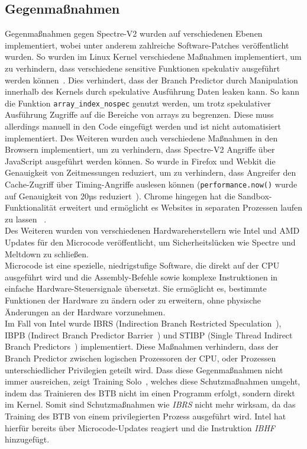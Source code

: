 \subsection{Gegenmaßnahmen}
\label{subsec:spectre_gegenmassnahmen}
Gegenmaßnahmen gegen Spectre-V2 wurden auf verschiedenen Ebenen implementiert, wobei unter anderem zahlreiche Software-Patches veröffentlicht wurden.
So wurden im Linux Kernel verschiedene Maßnahmen implementiert, um zu verhindern, dass verschiedene sensitive Funktionen spekulativ ausgeführt werden können~\cite{linux_nospec}.
Dies verhindert, dass der Branch Predictor durch Manipulation innerhalb des Kernels durch spekulative Ausführung Daten leaken kann.
So kann die Funktion \texttt{array\_index\_nospec} genutzt werden, um trotz spekulativer Ausführung Zugriffe auf die Bereiche von arrays zu begrenzen.
Diese muss allerdings manuell in den Code eingefügt werden und ist nicht automatisiert implementiert.
Des Weiteren wurden auch verschiedene Maßnahmen in den Browsern implementiert, um zu verhindern, dass Spectre-V2 Angriffe über JavaScript ausgeführt werden können.
So wurde in Firefox und Webkit die Genauigkeit von Zeitmessungen reduziert, um zu verhindern, dass Angreifer den Cache-Zugriff über Timing-Angriffe auslesen können (\texttt{performance.now()} wurde auf Genauigkeit von 20µs reduziert~\cite{luke_wagner_2018}).
Chrome hingegen hat die Sandbox-Funktionalität erweitert und ermöglicht es Websites in separaten Prozessen laufen zu lassen
~\cite{heise_2018_spec}.\\
Des Weiteren wurden von verschiedenen Hardwareherstellern wie Intel und AMD Updates für den Microcode veröffentlicht, um Sicherheitslücken wie Spectre und Meltdown zu schließen. \\
Microcode ist eine spezielle, niedrigstufige Software, die direkt auf der CPU ausgeführt wird und die Assembly-Befehle sowie komplexe Instruktionen in einfache Hardware-Steuersignale übersetzt.
Sie ermöglicht es, bestimmte Funktionen der Hardware zu ändern oder zu erweitern, ohne physische Änderungen an der Hardware vorzunehmen. \\
Im Fall von Intel wurde IBRS (Indirection Branch Restricted Speculation~\cite{intel_1}), IBPB (Indirect Branch Predictor Barrier~\cite{intel_2}) und STIBP (Single Thread Indirect Branch Predictors~\cite{intel_3}) implementiert.
Diese Maßnahmen verhindern, dass der Branch Predictor zwischen logischen Prozessoren der CPU, oder Prozessen unterschiedlicher Privilegien geteilt wird.
Dass diese Gegenmaßnahmen nicht immer ausreichen, zeigt Training Solo~\cite{training_solo}, welches diese Schutzmaßnahmen umgeht, indem das Trainieren des BTB nicht im einen Programm erfolgt, sondern direkt im Kernel.
Somit sind Schutzmaßnahmen wie \textit{IBRS} nicht mehr wirksam, da das Training des BTB von einem privilegierten Prozess ausgeführt wird.
Intel hat hierfür bereits über Microcode-Updates reagiert und die Instruktion \textit{IBHF}~\cite{darkcrizt_2025} hinzugefügt.